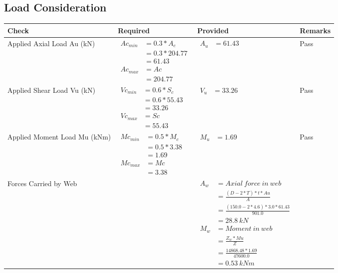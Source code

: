 \documentclass{article}%
\begin{document}
\subsection{Load Consideration}%
\label{subsec:LoadConsideration}%
\renewcommand{\arraystretch}{1.2}%
\begin{longtable}{|p{4cm}|p{3.5cm}|p{6.5cm}|p{1.5cm}|}%
\hline%
\rowcolor{OsdagGreen}%
Check&Required&Provided&Remarks\\%
\hline%
\endhead%
\hline%
Applied Axial Load Au (kN)&$\begin{aligned} Ac_{min} &= 0.3 * A_c\\ &= 0.3 *204.77\\ &=61.43\\ Ac_{max} &= Ac \\ &=204.77\end{aligned}$&$\begin{aligned} A_u &=61.43\end{aligned}$&Pass\\%
\hline%
Applied Shear Load Vu (kN)&$\begin{aligned} Vc_{min} &= 0.6 * S_c\\ &= 0.6 *55.43\\ &=33.26\\ Vc_{max} &= Sc \\ &=55.43\end{aligned}$&$\begin{aligned} V_u &=33.26\end{aligned}$&Pass\\%
\hline%
Applied Moment Load Mu (kNm)&$\begin{aligned} Mc_{min} &= 0.5 * M_c\\ &= 0.5 *3.38\\ &=1.69\\  Mc_{max} &= Mc \\ &=3.38\end{aligned}$&$\begin{aligned} M_u &=1.69\end{aligned}$&Pass\\%
\hline%
Forces Carried by Web&&$\begin{aligned}A_w &= Axial~ force~ in~ web  \\   &= \frac{(D- 2*T)*t* Au }{A} \\ &= \frac{(150.0- 2*4.6)*3.0*61.43 }{901.0} \\ &=28.8~ kN\\ M_w &= Moment ~in ~web  \\  &= \frac{Z_w * Mu}{Z} \\ &= \frac{14868.48 * 1.69}{47600.0} \\ &=0.53~{kNm}\end{aligned}$&\\%

\end{longtable}
\end{document}
